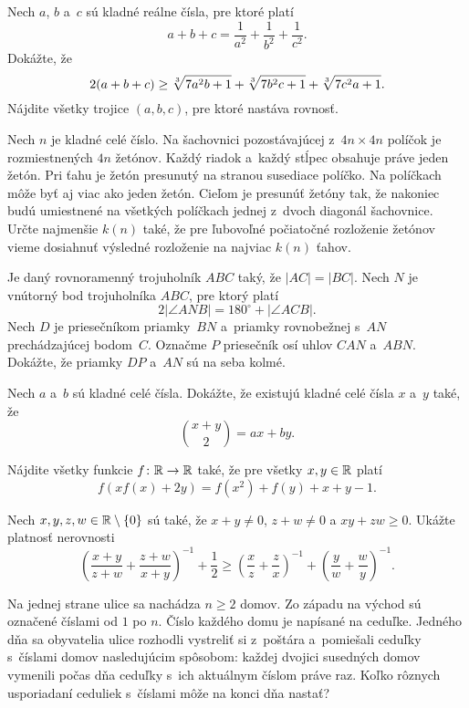 {%
Nech $a$, $b$ a~$c$ sú kladné reálne čísla, pre ktoré platí
$$
a+b+c=\frac{1}{a^2}+\frac{1}{b^2}+\frac{1}{c^2}.
$$
Dokážte, že
$$
2(a+b+c) \ge \root3\of{7a^2b+1}+\root3\of{7b^2c+1}+\root3\of{7c^2a+1}.
$$
Nájdite všetky trojice $(a,b,c)$, pre ktoré nastáva rovnosť.}

{%
Nech $n$ je kladné celé číslo. Na šachovnici pozostávajúcej z~$4n \times 4n$  políčok je rozmiestnených $4n$ žetónov. Každý riadok a~každý stĺpec obsahuje práve jeden žetón. Pri ťahu je žetón presunutý na stranou susediace políčko. Na políčkach môže byť aj viac ako jeden žetón. Cieľom je presunúť žetóny tak, že nakoniec budú umiestnené na všetkých políčkach jednej z~dvoch diagonál šachovnice. Určte najmenšie $k(n)$ také, že pre ľubovoľné počiatočné rozloženie žetónov vieme dosiahnuť výsledné rozloženie na najviac $k(n)$ ťahov.}

{%
Je daný rovnoramenný trojuholník $ABC$ taký, že $|AC|=|BC|$. Nech $N$ je vnútorný bod trojuholníka $ABC$, pre ktorý platí
$$
2|\angle ANB| = 180^\circ +|\angle ACB|.
$$
Nech $D$ je priesečníkom priamky~$BN$ a~priamky rovnobežnej s~$AN$ prechádzajúcej bodom~$C$. Označme $P$ priesečník osí uhlov $CAN$ a~$ABN$. Dokážte, že priamky $DP$ a~$AN$ sú na seba kolmé.}

{%
Nech $a$ a~$b$ sú kladné celé čísla. Dokážte, že existujú kladné celé čísla $x$ a~$y$ také, že
$$
\binom{x+y}{2} = ax + by.$$
}

{%
Nájdite všetky funkcie $f\colon\Bbb R \to \Bbb R$ také, že pre všetky $x,y\in\Bbb R$ platí
$$
f(xf(x)+2y)=f(x^2)+f(y)+x+y-1.
$$
}

{%
Nech $x,y,z,w\in\Bbb R \setminus \{0\}$ sú také, že $x +y \ne 0$, $z+w \ne 0$ a $xy+zw \ge 0$. Ukážte platnosť nerovnosti
$$
\left(\frac{x+y}{z+w}+\frac{z+w}{x+y}\right)^{-1} + \frac{1}{2} \ge \left(\frac{x}{z}+\frac{z}{x}\right)^{-1}+\left(\frac{y}{w}+\frac{w}{y}\right)^{-1}.
$$
}

{%
Na jednej strane ulice sa nachádza $n \ge 2$ domov. Zo západu na východ sú označené číslami od $1$ po $n$. Číslo každého domu je napísané na ceduľke.
Jedného dňa sa obyvatelia ulice rozhodli vystreliť si z~poštára a~pomiešali ceduľky s~číslami domov nasledujúcim spôsobom: každej dvojici susedných domov vymenili počas dňa ceduľky s~ich aktuálnym číslom práve raz. Koľko rôznych usporiadaní ceduliek s~číslami môže na konci dňa nastať?}

